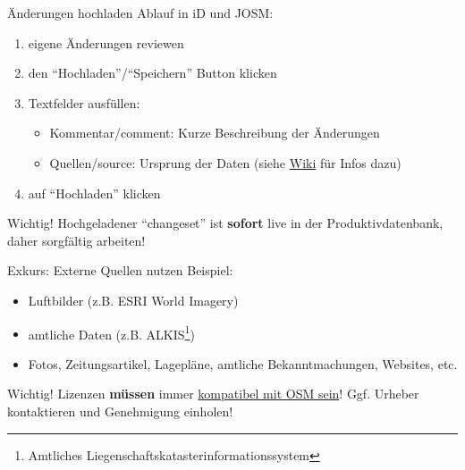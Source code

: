 \documentclass{beamer}
\begin{document}
			\begin{frame}{Änderungen hochladen}
				Ablauf in iD und JOSM:
				\begin{enumerate}
					\item eigene Änderungen reviewen\pause
					\item den \enquote{Hochladen}/\enquote{Speichern} Button klicken\pause
					\item Textfelder ausfüllen:
					\begin{itemize}
						\item Kommentar/comment: Kurze Beschreibung der Änderungen
						\item Quellen/source: Ursprung der Daten (siehe \href{https://wiki.openstreetmap.org/wiki/Key:source}{Wiki} für Infos dazu)
					\end{itemize}\pause
					\item auf \enquote{Hochladen} klicken
				\end{enumerate}
				\pause
				\vspace{0.25cm}
				{
					\begin{block}{Wichtig!}
						Hochgeladener \enquote{changeset} ist \textbf{sofort} live in der Produktivdatenbank, daher sorgfältig arbeiten!
					\end{block}
				}
			\end{frame}
			
			\begin{frame}{Exkurs: Externe Quellen nutzen}
				Beispiel:
				\begin{itemize}
					\item Luftbilder (z.B. ESRI World Imagery)
					\item amtliche Daten (z.B. ALKIS\footnote{Amtliches Liegenschaftskatasterinformationssystem})
					\item Fotos, Zeitungsartikel, Lagepläne, amtliche Bekanntmachungen, Websites, etc.
				\end{itemize}
				\pause
				\vspace{0.25cm}
				{
					\begin{block}{Wichtig!}
						Lizenzen \textbf{müssen} immer \href{https://wiki.openstreetmap.org/wiki/Import/ODbL_Compatibility}{kompatibel mit OSM sein}! Ggf. Urheber kontaktieren und Genehmigung einholen!
					\end{block}
				}
			\end{frame}
			
\end{document}
